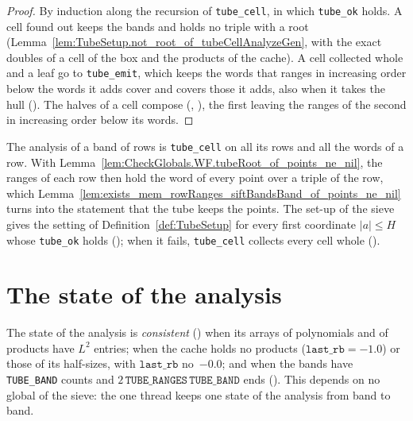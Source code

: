 \begin{proof}
  \leanok
  By induction along the recursion of \texttt{tube\_cell}, in which \texttt{tube\_ok} holds. A cell
  found out keeps the bands and holds no triple with a root
  (Lemma~\ref{lem:TubeSetup.not_root_of_tubeCellAnalyzeGen}, with the exact doubles of a cell of
  the box and the products of the cache). A cell collected whole and a leaf go to
  \texttt{tube\_emit}, which keeps the words that ranges in increasing order below the words it adds
  cover and covers those it adds, also when it takes the hull ().
  The halves of a cell compose (,
  ), the first leaving the ranges of the second in increasing
  order below its words.
\end{proof}

The analysis of a band of rows is \texttt{tube\_cell} on all its rows and all the words of a row.
With Lemma~\ref{lem:CheckGlobals.WF.tubeRoot_of_points_ne_nil}, the ranges of each row then hold
the word of every point over a triple of the row, which
Lemma~\ref{lem:exists_mem_rowRanges_siftBandsBand_of_points_ne_nil} turns into the statement that
the tube keeps the points. The set-up of the sieve gives the setting of
Definition~\ref{def:TubeSetup} for every first coordinate $|a| \le H$ whose \texttt{tube\_ok}
holds (); when it fails, \texttt{tube\_cell} collects every
cell whole ().

\section{The state of the analysis}\label{sec:tubeState}

The state of the analysis is \emph{consistent} () when its arrays of
polynomials and of products have $L^2$ entries; when the cache holds no products
($\mathtt{last\_rb} = -1.0$) or those of its half-sizes, with $\mathtt{last\_rb}$ no~$-0.0$; and
when the bands have \texttt{TUBE\_BAND} counts and $2\,\mathtt{TUBE\_RANGES}\,\mathtt{TUBE\_BAND}$
ends (). This depends on no global of the sieve: the one thread keeps
one state of the analysis from band to band.

